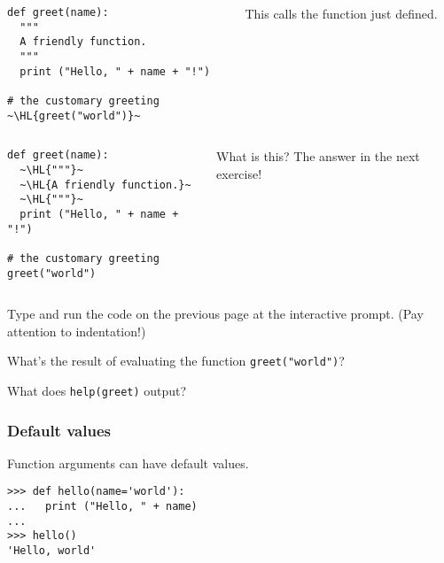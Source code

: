 \documentclass[english,serif,mathserif,xcolor=pdftex,dvipsnames,table]{beamer}
\newcounter{prompt}
\begin{document}
\begin{frame}[fragile]
  \begin{columns}[t]
    \begin{column}{0.5\textwidth}
\begin{lstlisting}
def greet(name):
  """
  A friendly function.
  """
  print ("Hello, " + name + "!")

# the customary greeting
~\HL{greet("world")}~
\end{lstlisting}
    \end{column}
    \begin{column}{0.5\textwidth}
      \raggedleft
      This calls the function just defined.
    \end{column}
  \end{columns}
\end{frame}

\begin{frame}[fragile]
  \begin{columns}[t]
    \begin{column}{0.5\textwidth}
\begin{lstlisting}
def greet(name):
  ~\HL{"""}~
  ~\HL{A friendly function.}~
  ~\HL{"""}~
  print ("Hello, " + name + "!")

# the customary greeting
greet("world")
\end{lstlisting}
    \end{column}
    \begin{column}{0.5\textwidth}
      \raggedleft
      What is this? The answer in the next exercise!
    \end{column}
  \end{columns}
\end{frame}

\begin{frame}
  \begin{exercise*}[2.B]
    Type and run the code on the previous page at the interactive
    prompt. (Pay attention to indentation!)

    \+
    What's the result of evaluating the function \texttt{greet("world")}?

    \+
    What does \texttt{help(greet)} output?
  \end{exercise*}
\end{frame}


\begin{frame}[fragile]
  \frametitle{Default values}

  Function arguments can have default values.
\begin{lstlisting}
>>> def hello(name='world'):
...   print ("Hello, " + name)
...
>>> hello()
'Hello, world'
\end{lstlisting}
\end{frame}
\end{document}
